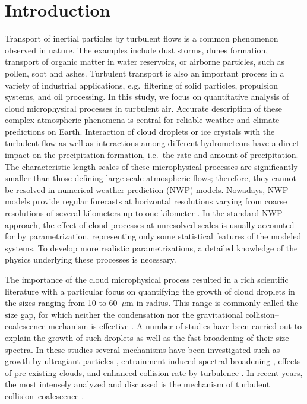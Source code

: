 \documentclass[../thesis.tex]{subfiles}
\begin{document}
\section{Introduction\label{sec:int}}

Transport of inertial particles by turbulent flows is a common phenomenon observed in nature. The examples include dust storms, dunes formation, transport of organic matter in water reservoirs, or airborne particles, such as pollen, soot and ashes. Turbulent transport is also an important process in a variety of industrial applications, e.g.\ filtering of solid particles, propulsion systems, and oil processing. In this study, we focus on quantitative analysis of cloud microphysical processes in turbulent air. Accurate description of these complex atmospheric phenomena is central for reliable weather and climate predictions on Earth. Interaction of cloud droplets or ice crystals with the turbulent flow as well as interactions among different hydrometeors have a direct impact on the precipitation formation, i.e.\ the rate and amount of precipitation. The characteristic length scales of these microphysical processes are significantly smaller than those defining large-scale atmospheric flows; therefore, they cannot be resolved in numerical weather prediction (NWP) models. Nowadays, NWP models provide regular forecasts at horizontal resolutions varying from coarse resolutions of several kilometers up to one kilometer \citep{YZCTOBCDDG18}. In the standard NWP approach, the effect of cloud processes at unresolved scales is usually accounted for by parametrization, representing only some statistical features of the modeled systems. To develop more realistic parametrizations, a detailed knowledge of the physics underlying these processes is necessary.

The importance of the cloud microphysical process resulted in a rich scientific literature with a particular focus on quantifying the growth of cloud droplets in the sizes ranging from 10 to 60~$\mu$m in radius. This range is commonly called the size gap, for which neither the condensation nor the gravitational collision--coalescence mechanism is effective \citep{PK97, CYBX18}. A number of studies have been carried out to explain the growth of such droplets as well as the fast broadening of their size spectra. In these studies several mechanisms have been investigated such as growth by ultragiant particles \citep{VC07,YLRT00}, entrainment-induced spectral broadening \citep{B93}, effects of pre-existing clouds, and enhanced collision rate by turbulence \citep{GW13,DBBCGIMRVW12,RPAGW13}. In recent years, the most intensely analyzed and discussed is the mechanism of turbulent collision--coalescence \citep{GW13,RWMG11,RPAGW13,WARG08,RPAW16}.
\end{document}
